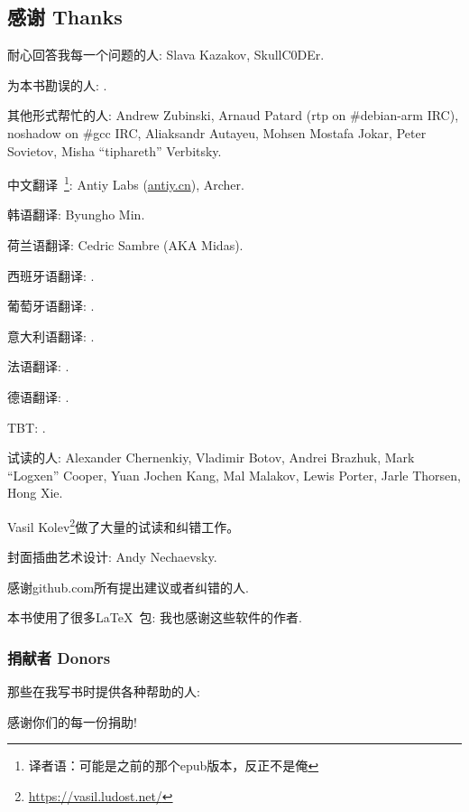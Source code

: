 \documentclass[UTF8,nofonts]{ctexart}
\begin{document}

\subsection*{感谢 Thanks}

耐心回答我每一个问题的人: Slava  Kazakov, SkullC0DEr.

为本书勘误的人: \PeopleMistakesInaccuracies{}.

其他形式帮忙的人:
Andrew Zubinski,
Arnaud Patard (rtp on \#debian-arm IRC),
noshadow on \#gcc IRC,
Aliaksandr Autayeu,
Mohsen Mostafa Jokar,
Peter Sovietov,
Misha ``tiphareth'' Verbitsky.

中文翻译~\footnote{译者语：可能是之前的那个epub版本，反正不是俺}:
Antiy Labs (\href{http://antiy.cn}{antiy.cn}), Archer.

韩语翻译: Byungho Min.

荷兰语翻译: Cedric Sambre (AKA Midas).

西班牙语翻译: \PeopleSpanishTranslators{}.

葡萄牙语翻译: \PeoplePTBRTranslators{}.

意大利语翻译: \PeopleItalianTranslators{}.

法语翻译: \PeopleFrenchTranslators{}.

德语翻译: \PeopleGermanTranslators{}.

\ac{TBT}: \PeoplePolishTranslators{}.


试读的人:
Alexander  Chernenkiy,
Vladimir Botov,
Andrei Brazhuk,
Mark ``Logxen'' Cooper, Yuan Jochen Kang, Mal Malakov, Lewis Porter, Jarle Thorsen, Hong Xie.

Vasil Kolev\footnote{\url{https://vasil.ludost.net/}}做了大量的试读和纠错工作。

封面插曲艺术设计: Andy Nechaevsky.

感谢github.com所有提出建议或者纠错的人\FNGithubContributors{}.

本书使用了很多\LaTeX\ 包: 我也感谢这些软件的作者.

\subsubsection*{捐献者 Donors}

那些在我写书时提供各种帮助的人:



感谢你们的每一份捐助!
\end{document}
